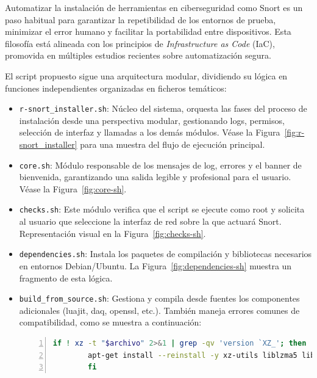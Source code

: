 \documentclass[11pt,a4paper,twoside]{report}
\begin{document}
Automatizar la instalación de herramientas en ciberseguridad como Snort es un paso habitual para garantizar la repetibilidad de los entornos de prueba, minimizar el error humano y facilitar la portabilidad entre dispositivos. Esta filosofía está alineada con los principios de \textit{Infrastructure as Code} (IaC), promovida en múltiples estudios recientes sobre automatización segura.
\newline

El script propuesto sigue una arquitectura modular, dividiendo su lógica en funciones independientes organizadas en ficheros temáticos:

\begin{itemize}
	\item \texttt{r-snort\_installer.sh}: Núcleo del sistema, orquesta las fases del proceso de instalación desde una perspectiva modular, gestionando logs, permisos, selección de interfaz y llamadas a los demás módulos.  
	Véase la Figura~\ref{fig:r-snort_installer} para una muestra del flujo de ejecución principal.
	
	\item \texttt{core.sh}: Módulo responsable de los mensajes de log, errores y el banner de bienvenida, garantizando una salida legible y profesional para el usuario.  
	Véase la Figura~\ref{fig:core-sh}.
	
	\item \texttt{checks.sh}: Este módulo verifica que el script se ejecute como root y solicita al usuario que seleccione la interfaz de red sobre la que actuará Snort.  
	Representación visual en la Figura~\ref{fig:checks-sh}.
	
	\item \texttt{dependencies.sh}: Instala los paquetes de compilación y bibliotecas necesarios en entornos Debian/Ubuntu.  
	La Figura~\ref{fig:dependencies-sh} muestra un fragmento de esta lógica.
	
	\item \texttt{build\_from\_source.sh}: Gestiona y compila desde fuentes los componentes adicionales (luajit, daq, openssl, etc.).  
	También maneja errores comunes de compatibilidad, como se muestra a continuación:
	
	\begin{lstlisting}[language=bash, caption={Corrección de versiones incompatibles de xz/liblzma}, label=lst:xz, basicstyle=\ttfamily\footnotesize, frame=single, numbers=left, numberstyle=\tiny, breaklines=true]
		if ! xz -t "$archivo" 2>&1 | grep -qv 'version `XZ_'; then
		apt-get install --reinstall -y xz-utils liblzma5 liblzma-dev
		fi
	\end{lstlisting}
	

\end{itemize}
\end{document}
